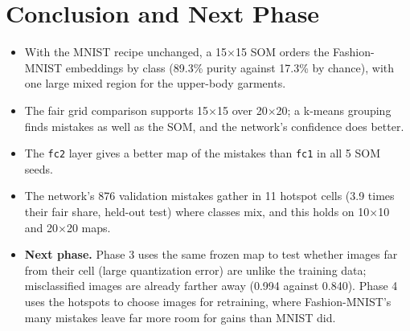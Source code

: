 \documentclass[11pt]{article}
\begin{document}
\section{Conclusion and Next Phase}

\begin{itemize}[leftmargin=1.4em, itemsep=2pt]
\item With the MNIST recipe unchanged, a 15$\times$15 SOM orders the Fashion-MNIST embeddings by class (89.3\% purity against 17.3\% by chance), with one large mixed region for the upper-body garments.
\item The fair grid comparison supports 15$\times$15 over 20$\times$20; a k-means grouping finds mistakes as well as the SOM, and the network's confidence does better.
\item The \texttt{fc2} layer gives a better map of the mistakes than \texttt{fc1} in all 5 SOM seeds.
\item The network's 876 validation mistakes gather in 11 hotspot cells (3.9 times their fair share, held-out test) where classes mix, and this holds on 10$\times$10 and 20$\times$20 maps.
\item \textbf{Next phase.} Phase 3 uses the same frozen map to test whether images far from their cell (large quantization error) are unlike the training data; misclassified images are already farther away (0.994 against 0.840). Phase 4 uses the hotspots to choose images for retraining, where Fashion-MNIST's many mistakes leave far more room for gains than MNIST did.
\end{itemize}

\printbibliography[title={References}]
\end{document}
